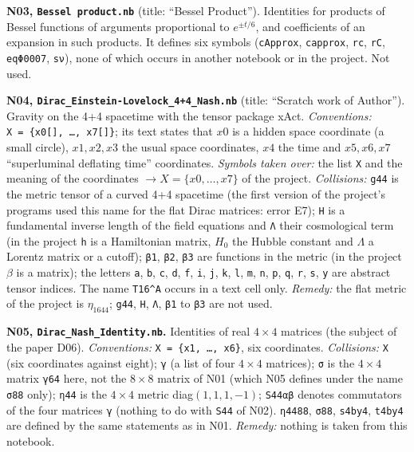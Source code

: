 \documentclass[
  10pt,
]{article}
\begin{document}
\textbf{N03, \texttt{Bessel\ product.nb}} (title: ``Bessel Product'').
Identities for products of Bessel functions of arguments proportional to
\(e^{\pm t/6}\), and coefficients of an expansion in such products. It
defines six symbols (\texttt{cApprox}, \texttt{capprox}, \texttt{rc},
\texttt{rC}, \texttt{eqΦ0007}, \texttt{sν}), none of which occurs in
another notebook or in the project. Not used.

\textbf{N04, \texttt{Dirac\_Einstein-Lovelock\_4+4\_Nash.nb}} (title:
``Scratch work of Author''). Gravity on the 4+4 spacetime with the
tensor package xAct. \emph{Conventions:}
\texttt{X\ =\ \{x0{[}{]},\ …,\ x7{[}{]}\}}; its text states that \(x0\)
is a hidden space coordinate (a small circle), \(x1,x2,x3\) the usual
space coordinates, \(x4\) the time and \(x5,x6,x7\) ``superluminal
deflating time'' coordinates. \emph{Symbols taken over:} the list
\texttt{X} and the meaning of the coordinates \(\to X=\{x0,\dots,x7\}\)
of the project. \emph{Collisions:} \texttt{g44} is the metric tensor of
a curved 4+4 spacetime (the first version of the project's programs used
this name for the flat Dirac matrices: error E7); \texttt{H} is a
fundamental inverse length of the field equations and \texttt{Λ} their
cosmological term (in the project \(\mathsf h\) is a Hamiltonian matrix,
\(H_0\) the Hubble constant and \(\Lambda\) a Lorentz matrix or a
cutoff); \texttt{β1}, \texttt{β2}, \texttt{β3} are functions in the
metric (in the project \(\beta\) is a matrix); the letters \texttt{a},
\texttt{b}, \texttt{c}, \texttt{d}, \texttt{f}, \texttt{i}, \texttt{j},
\texttt{k}, \texttt{l}, \texttt{m}, \texttt{n}, \texttt{p}, \texttt{q},
\texttt{r}, \texttt{s}, \texttt{y} are abstract tensor indices. The name
\texttt{T16\^{}A} occurs in a text cell only. \emph{Remedy:} the flat
metric of the project is \(\eta_{1644}\); \texttt{g44}, \texttt{H},
\texttt{Λ}, \texttt{β1} to \texttt{β3} are not used.

\textbf{N05, \texttt{Dirac\_Nash\_Identity.nb}.} Identities of real
\(4\times4\) matrices (the subject of the paper D06).
\emph{Conventions:} \texttt{X\ =\ \{x1,\ …,\ x6\}}, six coordinates.
\emph{Collisions:} \texttt{X} (six coordinates against eight);
\texttt{γ} (a list of four \(4\times4\) matrices); \texttt{σ} is the
\(4\times4\) matrix \texttt{γ64} here, not the \(8\times8\) matrix of
N01 (which N05 defines under the name \texttt{σ88} only); \texttt{η44}
is the \(4\times4\) metric diag\((1,1,1,-1)\); \texttt{S44αβ} denotes
commutators of the four matrices \texttt{γ} (nothing to do with
\texttt{S44} of N02). \texttt{η4488}, \texttt{σ88}, \texttt{s4by4},
\texttt{t4by4} are defined by the same statements as in N01.
\emph{Remedy:} nothing is taken from this notebook.
\end{document}
